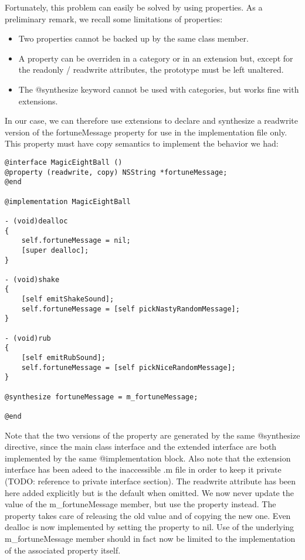 Fortunately, this problem can easily be solved by using properties. As a preliminary remark, we recall some limitations of properties:
\begin{itemize}
\item Two properties cannot be backed up by the same class member.
\item A property can be overriden in a category or in an extension but, except for the readonly / readwrite attributes, the prototype must be left unaltered.
\item The @synthesize keyword cannot be used with categories, but works fine with extensions.
\end{itemize}
In our case, we can therefore use extensions to declare and synthesize a readwrite version of the fortuneMessage property for use in the implementation file only. This property must have copy semantics to implement the behavior we had:
\begin{lstlisting}[frame=single, caption={MagicEightBall.m}]
@interface MagicEightBall ()
@property (readwrite, copy) NSString *fortuneMessage;
@end

@implementation MagicEightBall

- (void)dealloc
{
    self.fortuneMessage = nil;
    [super dealloc];
}

- (void)shake
{
    [self emitShakeSound];
    self.fortuneMessage = [self pickNastyRandomMessage];
}

- (void)rub
{
    [self emitRubSound];
    self.fortuneMessage = [self pickNiceRandomMessage];
}

@synthesize fortuneMessage = m_fortuneMessage;

@end
\end{lstlisting}
Note that the two versions of the property are generated by the same @synthesize directive, since the main class interface and the extended interface are both implemented by the same @implementation block. Also note that the extension interface has been adeed to the inaccessible .m file in order to keep it private (TODO: reference to private interface section). The readwrite attribute has been here added explicitly but is the default when omitted. We now never update the value of the m_fortuneMessage member, but use the property instead. The property takes care of releasing the old value and of copying the new one. Even dealloc is now implemented by setting the property to nil. Use of the underlying m_fortuneMessage member should in fact now be limited to the implementation of the associated property itself.

